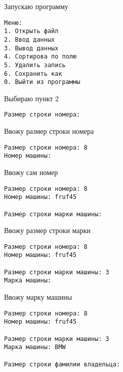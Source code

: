Запускаю программу

\begin{tcolorbox}
\begin{verbatim}
Меню:
1. Открыть файл     
2. Ввод данных      
3. Вывод данных     
4. Сортирова по полю
5. Удалить запись    
6. Сохранить как     
0. Выйти из программы
\end{verbatim}
\end{tcolorbox}

Выбираю пункт 2

\begin{tcolorbox}
\begin{verbatim}
Размер строки номера: 
\end{verbatim}
\end{tcolorbox}

Ввожу размер строки номера

\begin{tcolorbox}
\begin{verbatim}
Размер строки номера: 8  
Номер машины: 
\end{verbatim}
\end{tcolorbox}

Ввожу сам номер

\begin{tcolorbox}
\begin{verbatim}
Размер строки номера: 8  
Номер машины: fruf45

Размер строки марки машины: 
\end{verbatim}
\end{tcolorbox}

Ввожу размер строки марки 

\begin{tcolorbox}
\begin{verbatim}
Размер строки номера: 8
Номер машины: fruf45

Размер строки марки машины: 3
Марка машины: 
\end{verbatim}
\end{tcolorbox}

Ввожу марку машины

\begin{tcolorbox}
\begin{verbatim}
Размер строки номера: 8
Номер машины: fruf45

Размер строки марки машины: 3
Марка машины: BMW

Размер строки фамилии владельца: 
\end{verbatim}
\end{tcolorbox}

